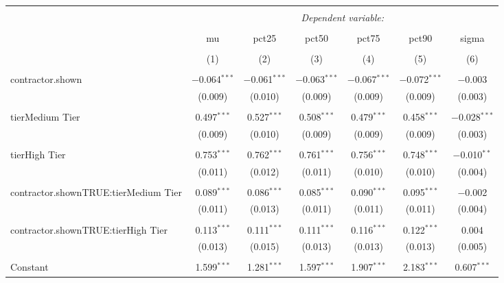 
\begin{table}[!htbp] \centering 
  \caption{} 
  \label{} 
\begin{tabular}{@{\extracolsep{5pt}}lcccccc} 
\\[-1.8ex]\hline 
\hline \\[-1.8ex] 
 & \multicolumn{6}{c}{\textit{Dependent variable:}} \\ 
\cline{2-7} 
\\[-1.8ex] & mu & pct25 & pct50 & pct75 & pct90 & sigma \\ 
\\[-1.8ex] & (1) & (2) & (3) & (4) & (5) & (6)\\ 
\hline \\[-1.8ex] 
 contractor.shown & $-$0.064$^{***}$ & $-$0.061$^{***}$ & $-$0.063$^{***}$ & $-$0.067$^{***}$ & $-$0.072$^{***}$ & $-$0.003 \\ 
  & (0.009) & (0.010) & (0.009) & (0.009) & (0.009) & (0.003) \\ 
  & & & & & & \\ 
 tierMedium Tier & 0.497$^{***}$ & 0.527$^{***}$ & 0.508$^{***}$ & 0.479$^{***}$ & 0.458$^{***}$ & $-$0.028$^{***}$ \\ 
  & (0.009) & (0.010) & (0.009) & (0.009) & (0.009) & (0.003) \\ 
  & & & & & & \\ 
 tierHigh Tier & 0.753$^{***}$ & 0.762$^{***}$ & 0.761$^{***}$ & 0.756$^{***}$ & 0.748$^{***}$ & $-$0.010$^{**}$ \\ 
  & (0.011) & (0.012) & (0.011) & (0.010) & (0.010) & (0.004) \\ 
  & & & & & & \\ 
 contractor.shownTRUE:tierMedium Tier & 0.089$^{***}$ & 0.086$^{***}$ & 0.085$^{***}$ & 0.090$^{***}$ & 0.095$^{***}$ & $-$0.002 \\ 
  & (0.011) & (0.013) & (0.011) & (0.011) & (0.011) & (0.004) \\ 
  & & & & & & \\ 
 contractor.shownTRUE:tierHigh Tier & 0.113$^{***}$ & 0.111$^{***}$ & 0.111$^{***}$ & 0.116$^{***}$ & 0.122$^{***}$ & 0.004 \\ 
  & (0.013) & (0.015) & (0.013) & (0.013) & (0.013) & (0.005) \\ 
  & & & & & & \\ 
 Constant & 1.599$^{***}$ & 1.281$^{***}$ & 1.597$^{***}$ & 1.907$^{***}$ & 2.183$^{***}$ & 0.607$^{***}$ \\ 

\end{tabular}
\end{table}
